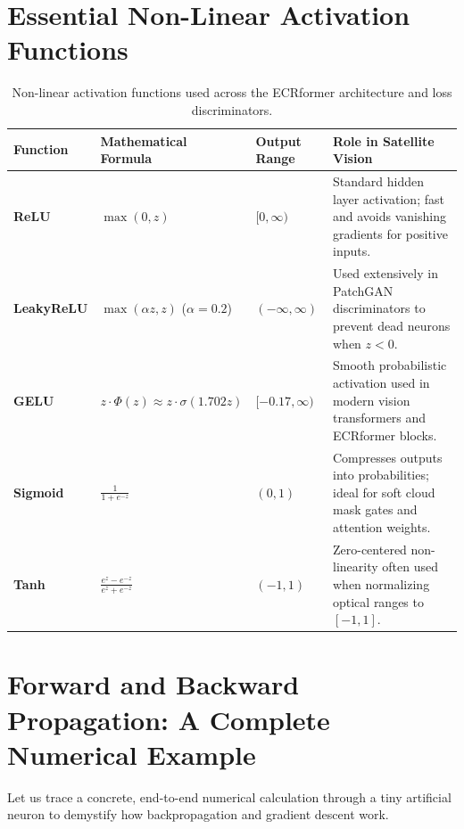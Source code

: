 \section{Essential Non-Linear Activation Functions}
\begin{table}[htbp]
\centering
\small
\begin{tabularx}{\textwidth}{lp{3.5cm}p{3.5cm}X}
\toprule
\textbf{Function} & \textbf{Mathematical Formula} & \textbf{Output Range} & \textbf{Role in Satellite Vision} \\
\midrule
\textbf{ReLU} & $\max(0, z)$ & $[0, \infty)$ & Standard hidden layer activation; fast and avoids vanishing gradients for positive inputs. \\
\textbf{LeakyReLU} & $\max(\alpha z, z)$ ($\alpha=0.2$) & $(-\infty, \infty)$ & Used extensively in PatchGAN discriminators to prevent dead neurons when $z < 0$. \\
\textbf{GELU} & $z \cdot \Phi(z) \approx z \cdot \sigma(1.702z)$ & $[-0.17, \infty)$ & Smooth probabilistic activation used in modern vision transformers and ECRformer blocks. \\
\textbf{Sigmoid} & $\frac{1}{1 + e^{-z}}$ & $(0, 1)$ & Compresses outputs into probabilities; ideal for soft cloud mask gates and attention weights. \\
\textbf{Tanh} & $\frac{e^z - e^{-z}}{e^z + e^{-z}}$ & $(-1, 1)$ & Zero-centered non-linearity often used when normalizing optical ranges to $[-1, 1]$. \\
\bottomrule
\end{tabularx}
\caption{Non-linear activation functions used across the ECRformer architecture and loss discriminators.}
\label{tab:activations}
\end{table}

\section{Forward and Backward Propagation: A Complete Numerical Example}
Let us trace a concrete, end-to-end numerical calculation through a tiny artificial neuron to demystify how backpropagation and gradient descent work.

